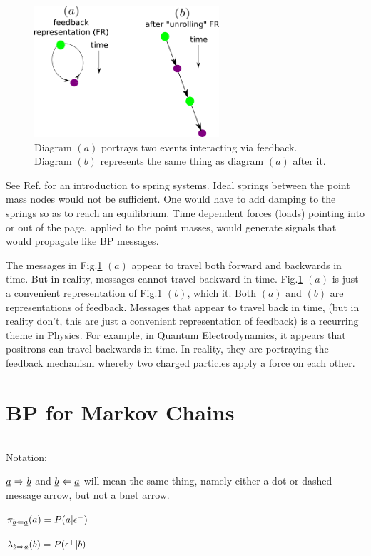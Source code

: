 \begin{figure}[h!]
\centering
\includegraphics[width=2.7in]
{mpass/time-travel.png}
\caption{Diagram $(a)$ portrays two events interacting via feedback. Diagram $(b)$
represents the same thing as diagram $(a)$
after  it.}
\label{fig-time-travel}
\end{figure}

See Ref.\cite{wiki-spring-net}
for an introduction to spring systems.
Ideal springs between the point mass
nodes would
not be sufficient.
One would have to add damping to
the springs so as
to reach an equilibrium.
Time dependent forces (loads)
pointing into or out of the page, applied
to the point masses, would
generate signals that would
propagate
like BP messages.


The messages in Fig.\ref{fig-time-travel} $(a)$
appear to travel both forward and backwards in time.
But in reality, messages cannot travel backward in time.  Fig.\ref{fig-time-travel} $(a)$
is just a convenient representation of
Fig.\ref{fig-time-travel} $(b)$, which  it. Both $(a)$ and $
(b)$ are representations of feedback.
Messages that appear to travel back in time,
(but in reality don't, this are just a convenient
representation of feedback)
is a recurring theme in Physics. For example,
in Quantum Electrodynamics, it appears that positrons can travel backwards in time.  In reality,
they are portraying the feedback mechanism whereby two
charged
particles
apply a force on each other.


\section{BP for Markov Chains}

\hrule
Notation:

$\rva\rdart\rvb$ and $\rvb\ldart\rva$ will mean the same thing, namely either a dot or dashed
message arrow, but not a bnet arrow.

$\pi_{\rvb\ldart\rva}(a) = P(a|\eps^-)$

$\lam_{\rvb\rdart\rva}(b) = P(\eps^+|b)$

